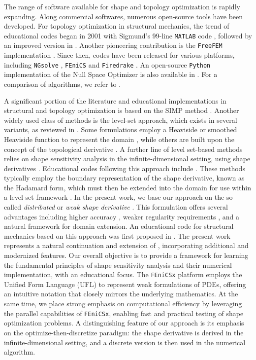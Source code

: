 \documentclass[preprint,9pt]{elsarticle}
\begin{document}
The range of software available for shape and topology
optimization is rapidly expanding.
Along commercial softwares, numerous open-source tools have been developed.
For topology optimization in structural mechanics,
the trend of educational codes began in 2001 with Sigmund's 99-line
\texttt{MATLAB} code \cite{Sigmund2014},
followed by an improved version in \cite{Andreassen2010}.
Another pioneering contribution is
the \texttt{FreeFEM} implementation \cite{MR2252743}.
Since then, codes have been released for various platforms,
including \texttt{NGsolve} \cite{MR4233697}, \texttt{FEniCS}
\cite{fenicsx, BLAUTH2021100646,MR3843884}
and \texttt{Firedrake} \cite{MR4244971}. 
An open-source \texttt{Python} implementation of
the Null Space Optimizer is also available in \cite{MR4686093}.
For a comparison of algorithms, we refer to \cite{Gain2013}.
 
A significant portion of the literature and educational implementations
in structural and topology optimization is based on
the SIMP method \cite{Sigmund2014}.
Another widely used class of methods is the level-set approach,
which exists in several variants, as reviewed in \cite{MR3107583}.
Some formulations employ a Heaviside or smoothed Heaviside
function to represent the domain \cite{MR1951408}, while others
are built upon the concept of the topological derivative
\cite{MR2235384,MR3013681,MR4916810}.
A further line of level set-based methods relies on shape sensitivity analysis
in the infinite-dimensional setting,
using shape derivatives \cite{MR2731611,MR1215733}.
Educational codes following this approach include \cite{Challis2009,MR2459656}.
These methods typically employ the boundary representation of the shape derivative,
known as the Hadamard form, which must then be extended into the domain for use
within a level-set framework \cite{MR2225309}.
In the present work, we base our approach on the so-called {\it distributed}
or {\it weak shape derivative} \cite{LAURAIN2020328,MR3535238}.
This formulation offers several advantages including
higher accuracy \cite{MR2642680,MR3348199}, 
weaker regularity requirements \cite{LAURAIN2020328},
and a natural framework for domain extension.
An educational code for structural mechanics based on
this approach was first proposed in \cite{MR3843884}.
The present work represents a natural continuation and extension of \cite{MR3843884},
incorporating additional and modernized features.
Our overall objective is to provide a framework for learning the fundamental
principles of shape sensitivity analysis and their
numerical implementation, with an educational focus. 
The \texttt{FEniCSx} platform \cite{fenicsx} employs
the Unified Form Language (UFL) to represent weak formulations of PDEs,
offering an intuitive notation that closely mirrors the underlying mathematics.
At the same time, we place strong emphasis on computational efficiency
by leveraging the parallel capabilities of \texttt{FEniCSx},
enabling fast and practical testing of shape optimization problems.
A distinguishing feature of our approach is its emphasis on
the optimize-then-discretize paradigm: the shape derivative
is derived in the infinite-dimensional setting, and a discrete
version is then used in the numerical algorithm.
\end{document}
